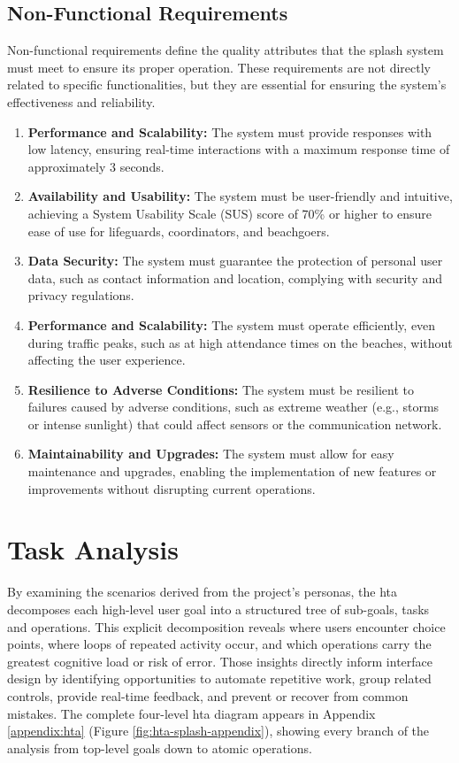 \subsection{Non-Functional Requirements}
\label{section:non_funt_req}
Non-functional requirements define the quality attributes that the \ac{splash} system must meet to ensure its proper operation. These requirements are not directly related to specific functionalities, but they are essential for ensuring the system’s effectiveness and reliability.
\begin{enumerate}
    \item \textbf{Performance and Scalability:} The system must provide responses with low latency, ensuring real-time interactions with a maximum response time of approximately 3 seconds.
    \item \textbf{Availability and Usability: } The system must be user-friendly and intuitive, achieving a System Usability Scale (SUS) score of 70\% or higher to ensure ease of use for lifeguards, coordinators, and beachgoers.
     \item \textbf{Data Security: }The system must guarantee the protection of personal user data, such as contact information and location, complying with security and privacy regulations.
       \item \textbf{Performance and Scalability: } The system must operate efficiently, even during traffic peaks, such as at high attendance times on the beaches, without affecting the user experience.
        \item \textbf{Resilience to Adverse Conditions: } The system must be resilient to failures caused by adverse conditions, such as extreme weather (e.g., storms or intense sunlight) that could affect sensors or the communication network.
         \item \textbf{Maintainability and Upgrades: }The system must allow for easy maintenance and upgrades, enabling the implementation of new features or improvements without disrupting current operations.
\end{enumerate}

\section{Task Analysis}
\label{section:task_analysis}
By examining the scenarios derived from the project’s personas, the \ac{hta} decomposes each high-level user goal into a structured tree of sub-goals, tasks and operations. This explicit decomposition reveals where users encounter choice points, where loops of repeated activity occur, and which operations carry the greatest cognitive load or risk of error. Those insights directly inform interface design by identifying opportunities to automate repetitive work, group related controls, provide real-time feedback, and prevent or recover from common mistakes. The complete four-level \ac{hta} diagram appears in Appendix \ref{appendix:hta} (Figure \ref{fig:hta-splash-appendix}), showing every branch of the analysis from top-level goals down to atomic operations.

\newpage
